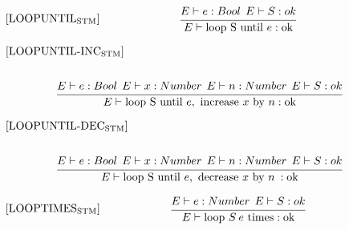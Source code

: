 \begin{equation}
\begin{minipage}{.2\linewidth}
$[\text{LOOPUNTIL}_\text{STM}]$
\end{minipage}
\begin{minipage}{.8\linewidth}
\centering
$\cfrac{E \vdash e : Bool \: \: E \vdash S : ok}{E \vdash \text{loop S until } e : \text{ok}}$
\end{minipage}
\end{equation}

\begin{equation}
\begin{split}
\begin{minipage}{\linewidth}
$[\text{LOOPUNTIL-INC}_\text{STM}]$
\end{minipage}
\\\\
\begin{minipage}{\linewidth}
\centering
$\cfrac{E \vdash e : Bool \: \: E \vdash x : Number \: \: E \vdash n : Number \: \:  E \vdash S : ok}{E \vdash \text{loop S until } e, \text{ increase } x \text{ by } n : \text{ok}}$
\end{minipage}
\end{split}
\end{equation}

\begin{equation}
\begin{split}
\begin{minipage}{\linewidth}
$[\text{LOOPUNTIL-DEC}_\text{STM}]$
\end{minipage}
\\\\
\begin{minipage}{\linewidth}
\centering
$\cfrac{E \vdash e : Bool \: \: E \vdash x : Number \: \: E \vdash n : Number \: \:  E \vdash S : ok}{E \vdash \text{loop S until } e, \text{ decrease } x \text{ by } n \: : \text{ok}}$
\end{minipage}
\end{split}
\end{equation}

\begin{equation}
\begin{minipage}{.2\linewidth}
$[\text{LOOPTIMES}_\text{STM}]$
\end{minipage}
\begin{minipage}{.8\linewidth}
\centering
$\cfrac{E \vdash e : Number \: \: E \vdash S : ok}{E \vdash \text{loop } S \: e \text{ times} : \text{ok}}$
\end{minipage}
\end{equation}

